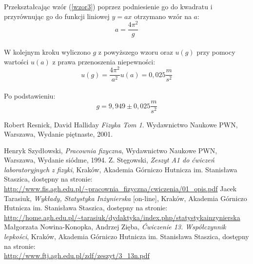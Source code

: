 \documentclass{article}
\newlength{\RoundedBoxWidth}
\newenvironment{GrayBox}[1][\dimexpr\textwidth-4.5ex]%
   {\setlength{\RoundedBoxWidth}{\dimexpr#1}
    \begin{lrbox}{\GrayRoundedBox}
       \begin{minipage}{\RoundedBoxWidth}}%
   {   \end{minipage}
    \end{lrbox}
    \begin{center}
    \begin{tikzpicture}%
       \draw node[draw=black,fill=black!1,rounded corners,%
             inner sep=2ex,text width=\RoundedBoxWidth]%
             {\usebox{\GrayRoundedBox}};
    \end{tikzpicture}
    \end{center}}
\begin{document}
\begin{itemize}
	Przekształcając wzór (\ref{wzor3}) poprzez podniesienie go do kwadratu i przyrównując go do funkcji liniowej $y=ax$ otrzymano wzór na $a$:\\
	\[a=\frac{4\pi^2}{g}
	\]\\
	W kolejnym kroku wyliczono $g$ z powyższego wzoru oraz $u(g)$ przy pomocy wartości $u(a)$ z prawa przenoszenia niepewności:\\
	\[u(g) = \frac{4\pi^2}{a^2}u(a) = 0,025 \frac{m}{s^2}
	\]\\
	Po podstawieniu:\\
	\[g = 9,949 \pm 0,025 \frac{m}{s^2}
	\]
	

  \end{itemize}

	
	








\begin{thebibliography}{9}
 
  Robert Resnick, David Halliday
  \emph{Fizyka Tom 1}.
    Wydawnictwo Naukowe PWN, Warszawa,
  Wydanie piętnaste,
  2001.


 Henryk Szydłowski,
 \emph{Pracownia fizyczna}, Wydawnictwo Naukowe PWN, Warszawa, Wydanie siódme, 1994.
  Z. Stęgowski,
  \emph{Zeszyt A1 do ćwiczeń laboratoryjnych z fizyki}, Kraków, Akademia Górniczo Hutnicza im. Stanisława Staszica, dostępny na stronie:\\
  \url{http://www.fis.agh.edu.pl/~pracownia_fizyczna/cwiczenia/01_opis.pdf}
 Jacek Tarasiuk,
 \emph{Wykłady, Statystyka Inżynierska} [on-line], Kraków, Akademia Górniczo Hutnicza im. Stanisława Staszica, dostępny na stronie:\\
  \url{http://home.agh.edu.pl/~tarasiuk/dydaktyka/index.php/statystykainzynierska}
  Małgorzata Nowina-Konopka, Andrzej Zięba,
  \emph{Ćwiczenie 13. Współczynnik lepkości}, Kraków, Akademia Górniczo Hutnicza im. Stanisława Staszica, dostępny na stronie:\\
  \url{http://www.ftj.agh.edu.pl/zdf/zeszyt/3_13n.pdf}


\end{thebibliography}
\vspace{2cm}
\end{document}
